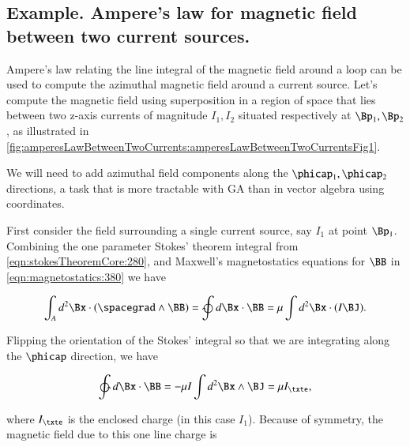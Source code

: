 %
%
\subsection{Example.  Ampere's law for magnetic field between two current sources.}

Ampere's law relating the line integral of the magnetic field around a loop can be used to compute the azimuthal magnetic field around a current source.
Let's compute the magnetic field using superposition in a region of space that lies between two z-axis currents of magnitude \( I_1, I_2 \) situated respectively at \( \Bp_1, \Bp_2 \), as illustrated in
\cref{fig:amperesLawBetweenTwoCurrents:amperesLawBetweenTwoCurrentsFig1}.


We will need to add azimuthal field components along the \( \phicap_1, \phicap_2 \) directions, a task that is more tractable with GA than in vector algebra using coordinates.

First consider the field surrounding a single current source, say \( I_1 \) at point \( \Bp_1 \).
Combining the one parameter Stokes' theorem integral from \cref{eqn:stokesTheoremCore:280}, and Maxwell's magnetostatics equations for \( \BB \) in \cref{eqn:magnetostatics:380} we have

\begin{dmath}\label{eqn:amperesLawMagnetostaticsExample:20}
\int_A d^2 \Bx \cdot (\spacegrad \wedge \BB) = \ointclockwise d\Bx \cdot \BB = \mu \int d^2 \Bx \cdot (I \BJ).
\end{dmath}

Flipping the orientation of the Stokes' integral so that we are integrating along the \( \phicap \) direction, we have

\begin{dmath}\label{eqn:amperesLawMagnetostaticsExample:40}
\ointctrclockwise d\Bx \cdot \BB
= -\mu I \int d^2 \Bx \wedge \BJ
= \mu I_\txte,
\end{dmath}

where \( I_\txte \) is the enclosed charge (in this case \( I_1 \)).
Because of symmetry, the magnetic field due to this one line charge is

